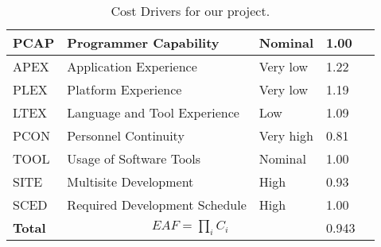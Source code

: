 \begin{table}[p]
\begin{tabular}{| l | l | l | l | l |}
        \hline
        PCAP            & Programmer Capability                     & Nominal              & 1.00              \\
        \hline
        APEX            & Application Experience                    & Very low             & 1.22              \\
        \hline
        PLEX            & Platform Experience                       & Very low             & 1.19              \\
        \hline
        LTEX            & Language and Tool Experience              & Low                  & 1.09              \\
        \hline
        PCON            & Personnel Continuity                      & Very high            & 0.81              \\
        \hline
        TOOL            & Usage of Software Tools                   & Nominal              & 1.00              \\
        \hline
        SITE            & Multisite Development                     & High                 & 0.93              \\
        \hline
        SCED            & Required Development Schedule             & High                 & 1.00              \\
        \hline
        \textbf{Total}  & \multicolumn{2}{|c|}{$EAF=\prod_i C_i$}                              & 0.943             \\
        \hline
    \end{tabular}
    \caption{Cost Drivers for our project.}
    \label{tab:cost-drivers}
\end{table}
